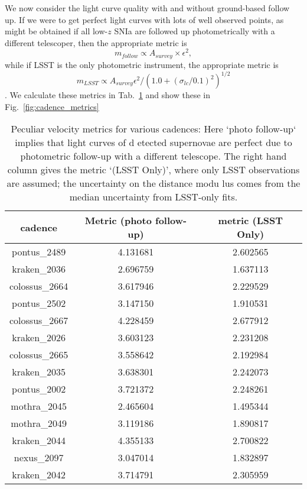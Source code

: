 We now consider the light curve quality with and without ground-based follow up.
If we were to get perfect light curves with lots of well observed points, as might be obtained if all low-$z$ SNIa are followed up photometrically with a different telescoper, then the appropriate metric is 
\begin{equation}
    m_{follow} \propto A_{survey} \times \epsilon^2,
\end{equation}
while if LSST is the only photometric instrument, the appropriate metric is
\begin{equation}
    m_{LSST} \propto A_{survey} \epsilon^2 /(1.0 + \left(\sigma_{lc}/0.1\right)^2)^{1/2}
\end{equation}. We calculate these metrics in Tab.~\ref{tab:cadence_metrics} and show these in Fig.~\ref{fig:cadence_metrics}



\begin{table}
\begin{center}
\begin{tabular}{|c|c|c|}
    \hline
     cadence &  Metric (photo follow-up) &  metric (LSST Only) \\
     \hline
     pontus\_2489 &         4.131681 &     2.602565 \\
     kraken\_2036 &         2.696759 &     1.637113 \\
   colossus\_2664 &         3.617946 &     2.229529 \\
     pontus\_2502 &         3.147150 &     1.910531 \\
   colossus\_2667 &         4.228459 &     2.677912 \\
     kraken\_2026 &         3.603123 &     2.231208 \\
   colossus\_2665 &         3.558642 &     2.192984 \\
     kraken\_2035 &         3.638301 &     2.242073 \\
     pontus\_2002 &         3.721372 &     2.248261 \\
     mothra\_2045 &         2.465604 &     1.495344 \\
     mothra\_2049 &         3.119186 &     1.890817 \\
     kraken\_2044 &         4.355133 &     2.700822 \\
      nexus\_2097 &         3.047014 &     1.832897 \\
     kraken\_2042 &         3.714791 &     2.305959 \\
     \hline
\end{tabular}
\end{center}
\caption{Peculiar velocity metrics for various cadences: Here `photo follow-up` implies that light curves of d
etected supernovae are perfect due to photometric follow-up with a different telescope. The right hand column 
gives the metric `(LSST Only)', where only LSST observations are assumed; the uncertainty on the distance modu
lus comes from the median uncertainty from LSST-only fits.}
\label{tab:cadence_metrics}
\end{table}

